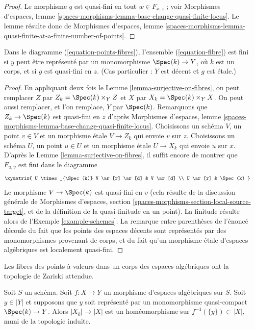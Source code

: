 \begin{proof}
Le morphisme $q$ est quasi-fini en tout $w \in F_{x, z}$ ; voir
Morphismes d'espaces, lemme
\ref{spaces-morphisms-lemma-base-change-quasi-finite-locus}.
Le lemme résulte donc de
Morphismes d'espaces, lemme
\ref{spaces-morphisms-lemma-quasi-finite-at-a-finite-number-of-points}.
\end{proof}

\begin{lemma}
\label{lemma-decent-finite-fibre}
Dans le diagramme (\ref{equation-points-fibres}), l'ensemble
(\ref{equation-fibre}) est fini si $y$ peut être représenté par un
monomorphisme $\Spec(k) \to Y$, où $k$ est un corps, et si $g$ est quasi-fini
en $z$. (Cas particulier : $Y$ est décent et $g$ est étale.)
\end{lemma}

\begin{proof}
En appliquant deux fois le Lemme \ref{lemma-surjective-on-fibres},
on peut remplacer $Z$ par $Z_k = \Spec(k) \times_Y Z$ et
$X$ par $X_k = \Spec(k) \times_Y X$. On peut aussi remplacer, et l'on
remplace, $Y$ par $\Spec(k)$. Remarquons que $Z_k \to \Spec(k)$ est quasi-fini
en $z$ d'après Morphismes d'espaces, lemme
\ref{spaces-morphisms-lemma-base-change-quasi-finite-locus}.
Choisissons un schéma $V$, un point $v \in V$ et un morphisme étale
$V \to Z_k$ qui envoie $v$ sur $z$. Choisissons un schéma $U$, un point
$u \in U$ et un morphisme étale $U \to X_k$ qui envoie $u$ sur $x$.
D'après le Lemme \ref{lemma-surjective-on-fibres},
il suffit encore de montrer que $F_{u, v}$ est fini dans le diagramme
$$
\xymatrix{
U \times_{\Spec(k)} V \ar[r] \ar[d] & V \ar[d] \\
U \ar[r] & \Spec(k)
}
$$
Le morphisme $V \to \Spec(k)$ est quasi-fini en $v$
(cela résulte de la discussion générale de
Morphismes d'espaces, section
\ref{spaces-morphisms-section-local-source-target},
et de la définition de la quasi-finitude en un point).
La finitude résulte alors de l'Exemple \ref{example-schemes}.
La remarque entre parenthèses de l'énoncé découle du fait que les points des
espaces décents sont représentés par des monomorphismes provenant de corps,
et du fait qu'un morphisme étale d'espaces algébriques est localement
quasi-fini.
\end{proof}

\begin{lemma}
\label{lemma-topology-fibre}
\begin{slogan}
Les fibres des points à valeurs dans un corps des espaces algébriques ont la
topologie de Zariski attendue.
\end{slogan}
Soit $S$ un schéma. Soit $f : X \to Y$ un morphisme d'espaces algébriques
sur $S$.
Soit $y \in |Y|$ et supposons que $y$ soit représenté par un monomorphisme
quasi-compact $\Spec(k) \to Y$. Alors $|X_k| \to |X|$ est un homéomorphisme
sur $f^{-1}(\{y\}) \subset |X|$, muni de la topologie induite.
\end{lemma}

